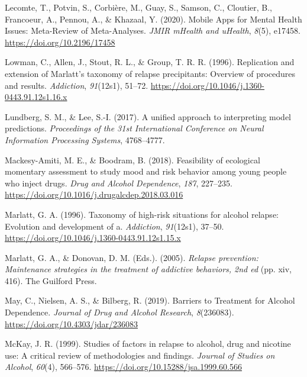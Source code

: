\documentclass[
  letterpaper,
  DIV=11,
  numbers=noendperiod]{scrartcl}
\newlength{\cslhangindent}
\newenvironment{CSLReferences}[2] %
 {\begin{list}{}{%
  \setlength{\itemindent}{0pt}
  \setlength{\leftmargin}{0pt}
  \setlength{\parsep}{0pt}
  \ifodd #1
   \setlength{\leftmargin}{\cslhangindent}
   \setlength{\itemindent}{-1\cslhangindent}
  \fi
  \setlength{\itemsep}{#2\baselineskip}}}
 {\end{list}}
\begin{document}
\begin{CSLReferences}{1}{0}
Lecomte, T., Potvin, S., Corbière, M., Guay, S., Samson, C., Cloutier,
B., Francoeur, A., Pennou, A., \& Khazaal, Y. (2020). Mobile {Apps} for
{Mental Health Issues}: {Meta-Review} of {Meta-Analyses}. \emph{JMIR
mHealth and uHealth}, \emph{8}(5), e17458.
\url{https://doi.org/10.2196/17458}

Lowman, C., Allen, J., Stout, R. L., \& Group, T. R. R. (1996).
Replication and extension of {Marlatt}'s taxonomy of relapse
precipitants: Overview of procedures and results. \emph{Addiction},
\emph{91}(12s1), 51--72.
\url{https://doi.org/10.1046/j.1360-0443.91.12s1.16.x}

Lundberg, S. M., \& Lee, S.-I. (2017). A unified approach to
interpreting model predictions. \emph{Proceedings of the 31st
{International Conference} on {Neural Information Processing Systems}},
4768--4777.

Mackesy-Amiti, M. E., \& Boodram, B. (2018). Feasibility of ecological
momentary assessment to study mood and risk behavior among young people
who inject drugs. \emph{Drug and Alcohol Dependence}, \emph{187},
227--235. \url{https://doi.org/10.1016/j.drugalcdep.2018.03.016}

Marlatt, G. A. (1996). Taxonomy of high-risk situations for alcohol
relapse: Evolution and development of a. \emph{Addiction},
\emph{91}(12s1), 37--50.
\url{https://doi.org/10.1046/j.1360-0443.91.12s1.15.x}

Marlatt, G. A., \& Donovan, D. M. (Eds.). (2005). \emph{Relapse
prevention: {Maintenance} strategies in the treatment of addictive
behaviors, 2nd ed} (pp. xiv, 416). The Guilford Press.

May, C., Nielsen, A. S., \& Bilberg, R. (2019). Barriers to {Treatment}
for {Alcohol Dependence}. \emph{Journal of Drug and Alcohol Research},
\emph{8}(236083). \url{https://doi.org/10.4303/jdar/236083}

McKay, J. R. (1999). Studies of factors in relapse to alcohol, drug and
nicotine use: A critical review of methodologies and findings.
\emph{Journal of Studies on Alcohol}, \emph{60}(4), 566--576.
\url{https://doi.org/10.15288/jsa.1999.60.566}


\end{CSLReferences}
\end{document}

